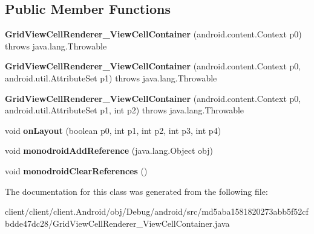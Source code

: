 \subsection*{Public Member Functions}
\begin{DoxyCompactItemize}
\item 
\hypertarget{classmd5aba1581820273abb5f52cfbdde47dc28_1_1GridViewCellRenderer__ViewCellContainer_aa440fc0cbad0a00d4f5980c23437ca5a}{}{\bfseries Grid\+View\+Cell\+Renderer\+\_\+\+View\+Cell\+Container} (android.\+content.\+Context p0)  throws java.\+lang.\+Throwable 	\label{classmd5aba1581820273abb5f52cfbdde47dc28_1_1GridViewCellRenderer__ViewCellContainer_aa440fc0cbad0a00d4f5980c23437ca5a}

\item 
\hypertarget{classmd5aba1581820273abb5f52cfbdde47dc28_1_1GridViewCellRenderer__ViewCellContainer_ab1b62b986b47e2647a849453ac0ecb93}{}{\bfseries Grid\+View\+Cell\+Renderer\+\_\+\+View\+Cell\+Container} (android.\+content.\+Context p0, android.\+util.\+Attribute\+Set p1)  throws java.\+lang.\+Throwable 	\label{classmd5aba1581820273abb5f52cfbdde47dc28_1_1GridViewCellRenderer__ViewCellContainer_ab1b62b986b47e2647a849453ac0ecb93}

\item 
\hypertarget{classmd5aba1581820273abb5f52cfbdde47dc28_1_1GridViewCellRenderer__ViewCellContainer_aa85098044e5452918b5874415305af35}{}{\bfseries Grid\+View\+Cell\+Renderer\+\_\+\+View\+Cell\+Container} (android.\+content.\+Context p0, android.\+util.\+Attribute\+Set p1, int p2)  throws java.\+lang.\+Throwable 	\label{classmd5aba1581820273abb5f52cfbdde47dc28_1_1GridViewCellRenderer__ViewCellContainer_aa85098044e5452918b5874415305af35}

\item 
\hypertarget{classmd5aba1581820273abb5f52cfbdde47dc28_1_1GridViewCellRenderer__ViewCellContainer_a65b3f4e75e0b553e2d9989d04304f00a}{}void {\bfseries on\+Layout} (boolean p0, int p1, int p2, int p3, int p4)\label{classmd5aba1581820273abb5f52cfbdde47dc28_1_1GridViewCellRenderer__ViewCellContainer_a65b3f4e75e0b553e2d9989d04304f00a}

\item 
\hypertarget{classmd5aba1581820273abb5f52cfbdde47dc28_1_1GridViewCellRenderer__ViewCellContainer_a15a3c40ffc4c40c969832f0e2a7a2fd1}{}void {\bfseries monodroid\+Add\+Reference} (java.\+lang.\+Object obj)\label{classmd5aba1581820273abb5f52cfbdde47dc28_1_1GridViewCellRenderer__ViewCellContainer_a15a3c40ffc4c40c969832f0e2a7a2fd1}

\item 
\hypertarget{classmd5aba1581820273abb5f52cfbdde47dc28_1_1GridViewCellRenderer__ViewCellContainer_ac7f1d650d773e6764843d713119258f7}{}void {\bfseries monodroid\+Clear\+References} ()\label{classmd5aba1581820273abb5f52cfbdde47dc28_1_1GridViewCellRenderer__ViewCellContainer_ac7f1d650d773e6764843d713119258f7}

\end{DoxyCompactItemize}


The documentation for this class was generated from the following file\+:\begin{DoxyCompactItemize}
\item 
client/client/client.\+Android/obj/\+Debug/android/src/md5aba1581820273abb5f52cfbdde47dc28/Grid\+View\+Cell\+Renderer\+\_\+\+View\+Cell\+Container.\+java\end{DoxyCompactItemize}
